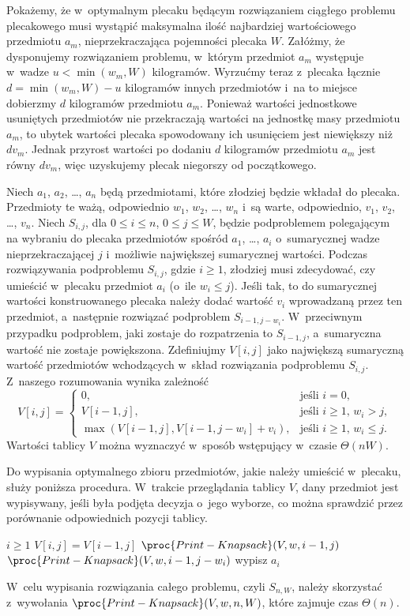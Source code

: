 
\exercise %
Pokażemy, że w~optymalnym plecaku będącym rozwiązaniem ciągłego problemu plecakowego musi wystąpić maksymalna ilość najbardziej wartościowego przedmiotu $a_m$, nieprzekraczająca pojemności plecaka $W$.
Załóżmy, że dysponujemy rozwiązaniem problemu, w~którym przedmiot $a_m$ występuje w~wadze $u<\min(w_m,W)$ kilogramów.
Wyrzućmy teraz z~plecaka łącznie $d=\min(w_m,W)-u$ kilogramów innych przedmiotów i~na to miejsce dobierzmy $d$ kilogramów przedmiotu $a_m$.
Ponieważ wartości jednostkowe usuniętych przedmiotów nie przekraczają wartości na jednostkę masy przedmiotu $a_m$, to ubytek wartości plecaka spowodowany ich usunięciem jest niewiększy niż $dv_m$.
Jednak przyrost wartości po dodaniu $d$ kilogramów przedmiotu $a_m$ jest równy $dv_m$, więc uzyskujemy plecak niegorszy od początkowego.

\exercise %
Niech $a_1$, $a_2$, \dots, $a_n$ będą przedmiotami, które złodziej będzie wkładał do plecaka.
Przedmioty te ważą, odpowiednio $w_1$, $w_2$, \dots, $w_n$ i~są warte, odpowiednio, $v_1$, $v_2$, \dots, $v_n$.
Niech $S_{i,j}$, dla $0\le i\le n$, $0\le j\le W$, będzie podproblemem polegającym na wybraniu do plecaka przedmiotów spośród $a_1$, \dots, $a_i$ o~sumarycznej wadze nieprzekraczającej $j$ i~możliwie największej sumarycznej wartości.
Podczas rozwiązywania podproblemu $S_{i,j}$, gdzie $i\ge1$, złodziej musi zdecydować, czy umieścić w~plecaku przedmiot $a_i$ (o~ile $w_i\le j$).
Jeśli tak, to do sumarycznej wartości konstruowanego plecaka należy dodać wartość $v_i$ wprowadzaną przez ten przedmiot, a~następnie rozwiązać podproblem $S_{i-1,j-w_i}$.
W~przeciwnym przypadku podproblem, jaki zostaje do rozpatrzenia to $S_{i-1,j}$, a~sumaryczna wartość nie zostaje powiększona.
Zdefiniujmy $V[i,j]$ jako największą sumaryczną wartość przedmiotów wchodzących w~skład rozwiązania podproblemu $S_{i,j}$.
Z~naszego rozumowania wynika zależność
\[
	V[i,j] = \begin{cases}
		0, & \text{jeśli $i=0$}, \\
		V[i-1,j], & \text{jeśli $i\ge1$, $w_i>j$}, \\
		\max(V[i-1,j],V[i-1,j-w_i]+v_i), & \text{jeśli $i\ge1$, $w_i\le j$}.
	\end{cases}
\]
Wartości tablicy $V$ można wyznaczyć w~sposób wstępujący w~czasie $\Theta(nW)$.

Do wypisania optymalnego zbioru przedmiotów, jakie należy umieścić w~plecaku, służy poniższa procedura.
W~trakcie przeglądania tablicy $V$, dany przedmiot jest wypisywany, jeśli była podjęta decyzja o~jego wyborze, co można sprawdzić przez porównanie odpowiednich pozycji tablicy.
\begin{codebox}
\li	\If $i\ge1$
\li		\Then \If $V[i,j]=V[i-1,j]$
\li				\Then $\proc{Print-Knapsack}(V,w,i-1,j)$
\li				\Else $\proc{Print-Knapsack}(V,w,i-1,j-w_i)$
\li					wypisz $a_i$
				\End
		\End
\end{codebox}
W~celu wypisania rozwiązania całego problemu, czyli $S_{n,W}$, należy skorzystać z~wywołania $\proc{Print-Knapsack}(V,w,n,W)$, które zajmuje czas $\Theta(n)$.

